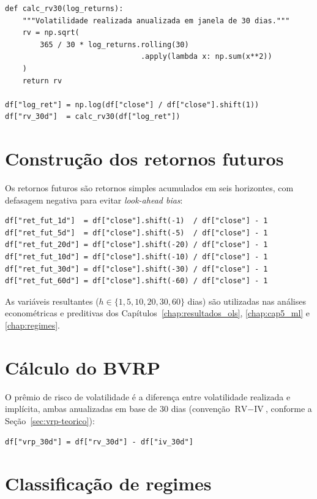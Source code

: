 \begin{verbatim}
def calc_rv30(log_returns):
    """Volatilidade realizada anualizada em janela de 30 dias."""
    rv = np.sqrt(
        365 / 30 * log_returns.rolling(30)
                               .apply(lambda x: np.sum(x**2))
    )
    return rv

df["log_ret"] = np.log(df["close"] / df["close"].shift(1))
df["rv_30d"]  = calc_rv30(df["log_ret"])
\end{verbatim}

\section{Construção dos retornos futuros}

Os retornos futuros são retornos simples acumulados em seis horizontes,
com defasagem negativa para evitar \textit{look-ahead bias}:

\begin{verbatim}
df["ret_fut_1d"]  = df["close"].shift(-1)  / df["close"] - 1
df["ret_fut_5d"]  = df["close"].shift(-5)  / df["close"] - 1
df["ret_fut_20d"] = df["close"].shift(-20) / df["close"] - 1
df["ret_fut_10d"] = df["close"].shift(-10) / df["close"] - 1
df["ret_fut_30d"] = df["close"].shift(-30) / df["close"] - 1
df["ret_fut_60d"] = df["close"].shift(-60) / df["close"] - 1
\end{verbatim}

As variáveis resultantes ($h \in \{1, 5, 10, 20, 30, 60\}$ dias) são utilizadas
nas análises econométricas e preditivas dos
Capítulos~\ref{chap:resultados_ols}, \ref{chap:cap5_ml}
e \ref{chap:regimes}.

\section{Cálculo do BVRP}

O prêmio de risco de volatilidade é a diferença entre volatilidade realizada e
implícita, ambas anualizadas em base de 30 dias (convenção
$\text{RV} - \text{IV}$, conforme a Seção~\ref{sec:vrp-teorico}):

\begin{verbatim}
df["vrp_30d"] = df["rv_30d"] - df["iv_30d"]
\end{verbatim}

\section{Classificação de regimes}

